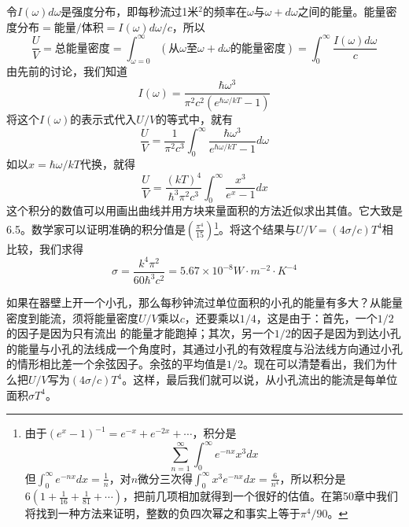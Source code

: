 令$I(\omega)d\omega$是强度分布，即每秒流过1米$^2$的频率在$\omega$与$\omega +d\omega$之间的能量。能量密度分布$=\text{能量}/\text{体积}=I(\omega)d\omega/ c$，所以
\begin{equation*}
    \frac{U}{V} = \text{总能量密度} = \int_{\omega=0}^\infty(\text{从$\omega$至$\omega + d\omega$的能量密度}) = \int_0^\infty \frac{I(\omega)d\omega}{c}
\end{equation*}
由先前的讨论，我们知道
\begin{equation*}
    I(\omega) = \frac{\hbar\omega^3}{\pi^2c^2(e^{\hbar\omega/kT} - 1)}
\end{equation*}
将这个$I(\omega)$的表示式代入$U/V$的等式中，就有
\begin{equation*}
    \frac{U}{V}=\frac{1}{\pi^2c^3}\int^\infty_0 \frac{\hbar\omega^3}{e^{\hbar\omega/kT} - 1}d\omega
\end{equation*}
如以$x=\hbar\omega/kT$代换，就得
\begin{equation*}
    \frac{U}{V}=\frac{(kT)^4}{\hbar^3\pi^2c^3}\int_0^\infty \frac{x^3}{e^x-1}dx
\end{equation*}
这个积分的数值可以用画出曲线并用方块来量面积的方法近似求出其值。它大致是6.5。数学家可以证明准确的积分值是$\left(\frac{\pi^4}{15}\right)$\footnote{
    由于$(e^x -1)^{-1} =e^{-x} +e^{-2x} +\cdots$，积分是\begin{equation*}
        \sum_{n=1}^{\infty}\int_0^\infty e^{-nx}x^3dx
    \end{equation*}但$\int_0^\infty e^{-nx}dx=\frac{1}{n}$，对$n$微分三次得$\int_0^\infty x^3e^{-nx}dx=\frac{6}{n^4}$，所以积分是$6\left(1+\frac{1}{16}+\frac{1}{81}+\cdots\right)$，把前几项相加就得到一个很好的估值。在第50章中我们将找到一种方法来证明，整数的负四次幂之和事实上等于$\pi^4/90$。
}。将这个结果与$U/V =(4\sigma /c)T^4$相比较，我们求得
\begin{equation*}
    \sigma = \frac{k^4\pi^2}{60\hbar^3c^2} = 5.67\times 10^{-8} W\cdot m^{-2}\cdot K^{-4}
\end{equation*}

如果在器壁上开一个小孔，那么每秒钟流过单位面积的小孔的能量有多大？从能量密度到能流，须将能量密度$U/V$乘以$c$，还要乘以$1/4$，这是由于：首先，一个$1/2$的因子是因为只有流出 的能量才能跑掉；其次，另一个$1/2$的因子是因为到达小孔的能量与小孔的法线成一个角度时，其通过小孔的有效程度与沿法线方向通过小孔的情形相比差一个余弦因子。余弦的平均值是$1/2$。现在可以清楚看出，我们为什么把$U/V$写为$(4\sigma/c)T^4$。这样，最后我们就可以说，从小孔流出的能流是每单位面积$\sigma T^4$。